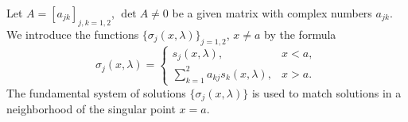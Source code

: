 \documentclass[blockverticalspace=25mm,colspace=25mm,25pt]{tikzposter} %
\begin{document}
\begin{columns}
{%
Let $A=[a_{jk}]_{j,k=1,2}$, $\det A\ne 0$ be a given matrix with complex numbers $a_{jk}$. We introduce the functions  $\{\sigma_j(x,\lambda)\}_{j=1,2}$, $x\neq a$ by the formula
\begin{equation*}
\sigma_j(x,\lambda)=\left\{
\begin{array}{ll}
s_j(x,\lambda), & x<a,\\
\sum\limits_{k=1}^{2}a_{kj}s_k(x,\lambda),&  x>a.
\end{array}\right.
\label{sigmajinsk}
\end{equation*}
The fundamental system of solutions $\{\sigma_j(x,\lambda)\}$ is used to match solutions in a neighborhood of the singular point  $x=a$. 

}
\end{columns}
\end{document}
